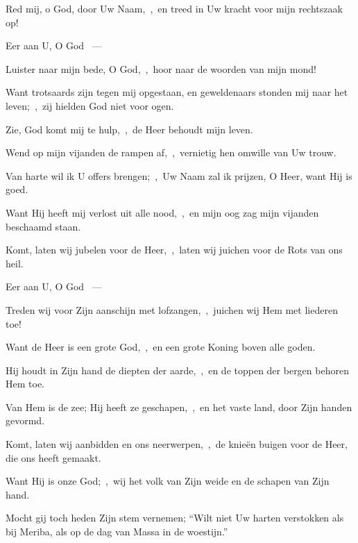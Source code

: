 \documentclass[12pt,twoside,a5paper]{article}
\begin{document}
\begin{halfparskip}
   

  Red mij, o God, door Uw Naam,~\sep\ en treed in Uw kracht voor mijn rechtszaak op!

  Eer aan U, O God ~---  

  Luister naar mijn bede, O God,~\sep\ hoor naar de woorden van mijn mond!

  Want trotsaards zijn tegen mij opgestaan, en geweldenaars stonden mij naar het leven;~\sep\ zij hielden God niet voor ogen.

  Zie, God komt mij te hulp,~\sep\ de Heer behoudt mijn leven.

  Wend op mijn vijanden de rampen af,~\sep\ vernietig hen omwille van Uw trouw.

  Van harte wil ik U offers brengen;~\sep\ Uw Naam zal ik prijzen, O Heer, want Hij is goed.

  Want Hij heeft mij verlost uit alle nood,~\sep\ en mijn oog zag mijn vijanden beschaamd staan.
\end{halfparskip}

\begin{halfparskip}
   

  Komt, laten wij jubelen voor de Heer,~\sep\ laten wij juichen voor de Rots van ons heil.

  Eer aan U, O God ~---  

  Treden wij voor Zijn aanschijn met lofzangen,~\sep\ juichen wij Hem met liederen toe!

  Want de Heer is een grote God,~\sep\ en een grote Koning boven alle goden.

  Hij houdt in Zijn hand de diepten der aarde,~\sep\ en de toppen der bergen behoren Hem toe.

  Van Hem is de zee; Hij heeft ze geschapen,~\sep\ en het vaste land, door Zijn handen gevormd.

  Komt, laten wij aanbidden en ons neerwerpen,~\sep\ de knieën buigen voor de Heer, die ons heeft gemaakt.

  Want Hij is onze God;~\sep\ wij het volk van Zijn weide en de schapen van Zijn hand.

  Mocht gij toch heden Zijn stem vernemen; ``Wilt niet Uw harten verstokken als bij Meriba, als op de dag van Massa in de woestijn.''
\end{halfparskip}
\end{document}
